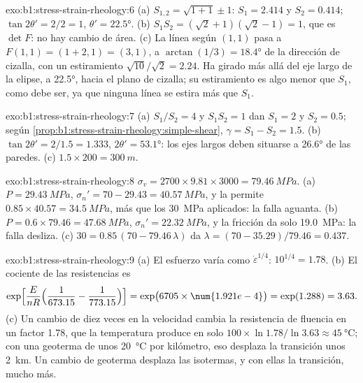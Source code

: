 \begin{solution}{exo:b1:stress-strain-rheology:6}
(a) $S_{1,2} = \sqrt{1 + 1} \pm 1$: $S_1 = 2.414$ y $S_2 = 0.414$;
$\tan2\theta' = 2/2 = 1$, $\theta' = \ang{22.5}$. (b) $S_1S_2 =
(\sqrt2 + 1)(\sqrt2 - 1) = 1$, que es $\det F$: no hay cambio de área. (c) La
línea según $(1, 1)$ pasa a $F(1, 1) = (1 + 2, 1) = (3, 1)$, a
$\arctan(1/3) = \ang{18.4}$ de la dirección de cizalla, con un estiramiento
$\sqrt{10}/\sqrt2 = 2.24$. Ha girado más allá del eje largo de la elipse, a
\ang{22.5}, hacia el plano de cizalla; su estiramiento es algo menor que
$S_1$, como debe ser, ya que ninguna línea se estira más que $S_1$.
\end{solution}

\begin{solution}{exo:b1:stress-strain-rheology:7}
(a) $S_1/S_2 = 4$ y $S_1S_2 = 1$ dan $S_1 = 2$ y $S_2 = 0.5$; según
\cref{prop:b1:stress-strain-rheology:simple-shear}, $\gamma = S_1 - S_2 =
1.5$. (b) $\tan2\theta' = 2/1.5 = 1.333$, $2\theta' = \ang{53.1}$: los ejes
largos deben situarse a \ang{26.6} de las paredes. (c) $1.5\times200 = \qty{300}{m}$.
\end{solution}

\begin{solution}{exo:b1:stress-strain-rheology:8}
$\sigma_v = 2700\times9.81\times3000 = \qty{79.46}{MPa}$. (a) $P = \qty{29.43}{MPa}$,
$\sigma_n' = 70 - 29.43 = \qty{40.57}{MPa}$, y la  permite
$0.85\times40.57 = \qty{34.5}{MPa}$, más que los \qty{30}{MPa} aplicados: la
falla aguanta. (b) $P = 0.6\times79.46 = \qty{47.68}{MPa}$, $\sigma_n' =
\qty{22.32}{MPa}$, y la fricción da solo \qty{19.0}{MPa}: la falla
desliza. (c) $30 = 0.85\,(70 - 79.46\,\lambda)$ da $\lambda = (70 -
35.29)/79.46 = 0.437$.
\end{solution}

\begin{solution}{exo:b1:stress-strain-rheology:9}
(a) El esfuerzo varía como $\dot\varepsilon^{1/4}$: $10^{1/4} = 1.78$. (b) El
cociente de las resistencias es
\[
  \exp\Bigl[\frac{E}{nR}\Bigl(\frac{1}{673.15} - \frac{1}{773.15}\Bigr)\Bigr]
  = \exp\bigl(6705\times\num{1.921e-4}\bigr) = \exp(1.288) = 3.63 .
\]
(c) Un cambio de diez veces en la velocidad cambia la resistencia de fluencia
en un factor 1.78, que la temperatura produce en solo $100\times\ln1.78/\ln3.63 \approx
\qty{45}{\degreeCelsius}$; con una geoterma de unos \qty{20}{\degreeCelsius}
por kilómetro, eso desplaza la transición unos \qty{2}{km}. Un cambio de
geoterma desplaza las isotermas, y con ellas la transición, mucho más.
\end{solution}

